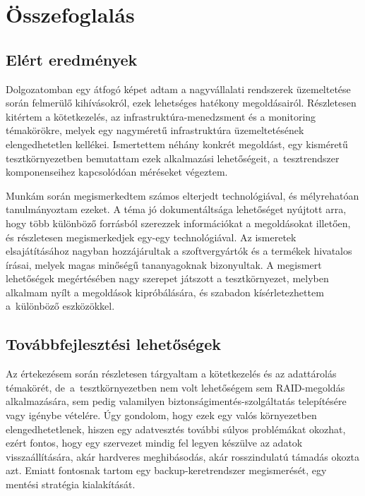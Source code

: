 
\chapter{Összefoglalás}

\section{Elért eredmények}
Dolgozatomban egy átfogó képet adtam a nagyvállalati rendszerek üzemeltetése során felmerülő kihívásokról, ezek lehetséges hatékony megoldásairól. Részletesen kitértem a kötetkezelés, az infrastruktúra-menedzsment és a monitoring témakörökre, melyek egy nagyméretű infrastruktúra üzemeltetésének elengedhetetlen kellékei. Ismertettem néhány konkrét megoldást, egy kisméretű tesztkörnyezetben bemutattam ezek alkalmazási lehetőségeit, a~tesztrendszer komponenseihez kapcsolódóan méréseket végeztem.

Munkám során megismerkedtem számos elterjedt technológiával, és mélyrehatóan tanulmányoztam ezeket. A téma jó dokumentáltsága lehetőséget nyújtott arra, hogy több különböző forrásból szerezzek információkat a megoldásokat illetően, és részletesen megismerkedjek egy-egy technológiával. Az ismeretek elsajátításához nagyban hozzájárultak a szoftvergyártók és a termékek hivatalos írásai, melyek magas minőségű tananyagoknak bizonyultak. A megismert lehetőségek megértésében nagy szerepet játszott a tesztkörnyezet, melyben alkalmam nyílt a megoldások kipróbálására, és szabadon kísérletezhettem a~különböző eszközökkel.

\section{Továbbfejlesztési lehetőségek}
Az értekezésem során részletesen tárgyaltam a kötetkezelés és az adattárolás témakörét, de~a~tesztkörnyezetben nem volt lehetőségem sem RAID-megoldás alkalmazására, sem pedig valamilyen biztonságimentés-szolgáltatás telepítésére vagy igénybe vételére. Úgy gondolom, hogy ezek egy valós környezetben elengedhetetlenek, hiszen egy adatvesztés további súlyos problémákat okozhat, ezért fontos, hogy egy szervezet mindig fel legyen készülve az adatok visszaállítására, akár hardveres meghibásodás, akár rosszindulatú támadás okozta azt. Emiatt fontosnak tartom egy backup-keretrendszer megismerését, egy mentési stratégia kialakítását.

